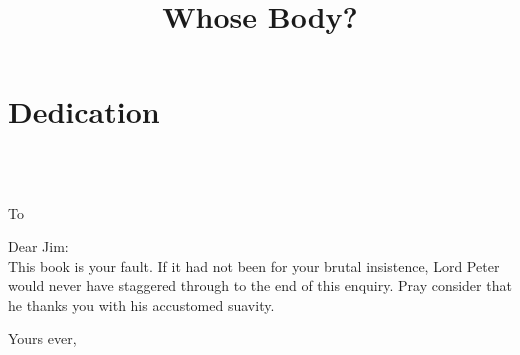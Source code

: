 \documentclass[
paper=5.5in:8.5in
]{scrbook}
\title{Whose Body?}
\begin{document}
\frontmatter
 



\pagestyle{plain}




\chapter*{Dedication}
~\\
~\\
\begin{center}\Large
To 
\end{center}

\noindent Dear Jim:
~\\

This book is your fault. If it had not been for your brutal insistence, Lord Peter would never have staggered through to the end of this enquiry. Pray consider that he thanks you with his accustomed suavity.

\begin{flushright}
Yours ever,\\
\end{flushright}


\tableofcontents

\mainmatter
{}
\pagestyle{headings}
















\clearpage
{}
\end{document}
